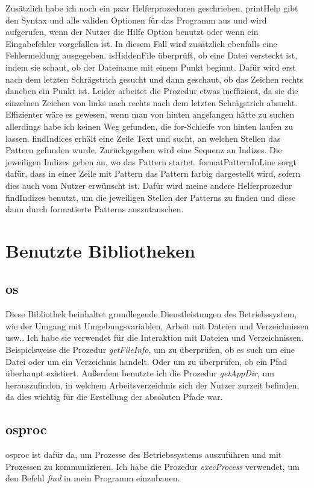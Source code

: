 \documentclass[11pt]{report}
\begin{document}
Zusätzlich habe ich noch ein paar Helferprozeduren geschrieben.
\newline
printHelp gibt den Syntax und alle validen Optionen für das Programm aus und wird aufgerufen, wenn der Nutzer die Hilfe Option benutzt oder wenn ein Eingabefehler vorgefallen ist. In diesem Fall wird zusätzlich ebenfalls eine Fehlermeldung ausgegeben.
\newline
isHiddenFile überprüft, ob eine Datei versteckt ist, indem sie schaut, ob der Dateiname mit einem Punkt beginnt. Dafür wird erst nach dem letzten Schrägstrich gesucht und dann geschaut, ob das Zeichen rechts daneben ein Punkt ist. Leider arbeitet die Prozedur etwas ineffizient, da sie die einzelnen Zeichen von links nach rechts nach dem letzten Schrägstrich absucht. Effizienter wäre es gewesen, wenn man von hinten angefangen hätte zu suchen allerdings habe ich keinen Weg gefunden, die for-Schleife von hinten laufen zu lassen.
\newline
findIndices erhält eine Zeile Text und sucht, an welchen Stellen das Pattern gefunden wurde. Zurückgegeben wird eine Sequenz an Indizes. Die jeweiligen Indizes geben an, wo das Pattern startet.
\newline
formatPatternInLine sorgt dafür, dass in einer Zeile mit Pattern das Pattern farbig dargestellt wird, sofern dies auch vom Nutzer erwünscht ist. Dafür wird meine andere Helferprozedur findIndizes benutzt, um die jeweiligen Stellen der Patterns zu finden und diese dann durch formatierte Patterns auszutauschen.


\section{Benutzte Bibliotheken}
\subsection{os}
Diese Bibliothek beinhaltet grundlegende Dienstleistungen des Betriebssystem, wie der Umgang mit Umgebungsvariablen, Arbeit mit Dateien und Verzeichnissen usw..
Ich habe sie verwendet für die Interaktion mit Dateien und Verzeichnissen. Beispielsweise die Prozedur \emph{getFileInfo}, um zu überprüfen, ob es such um eine Datei oder um ein Verzeichnis handelt. Oder um zu überprüfen, ob ein Pfad überhaupt existiert. Außerdem benutzte ich die Prozedur \emph{getAppDir}, um herauszufinden, in welchem Arbeitsverzeichnis sich der Nutzer zurzeit befinden, da dies wichtig für die Erstellung der absoluten Pfade war.
\subsection{osproc}
osproc ist dafür da, um Prozesse des Betriebssystems auszuführen und mit Prozessen zu kommunizieren.
Ich habe die Prozedur \emph{execProcess} verwendet, um den Befehl \emph{find} in mein Programm einzubauen.
\end{document}
